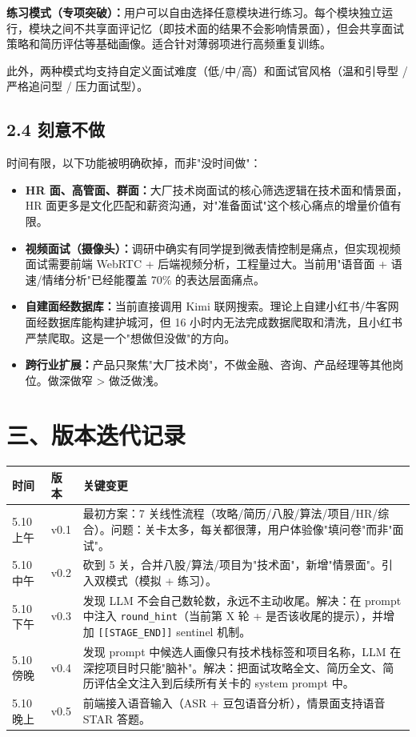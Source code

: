 \documentclass[11pt]{article}
\begin{document}
\textbf{练习模式（专项突破）：}用户可以自由选择任意模块进行练习。每个模块独立运行，模块之间不共享面评记忆（即技术面的结果不会影响情景面），但会共享面试策略和简历评估等基础画像。适合针对薄弱项进行高频重复训练。

此外，两种模式均支持自定义面试难度（低/中/高）和面试官风格（温和引导型 / 严格追问型 / 压力面试型）。

\subsection*{2.4 刻意不做}

时间有限，以下功能被明确砍掉，而非"没时间做"：

\begin{itemize}
    \item \textbf{HR 面、高管面、群面：}大厂技术岗面试的核心筛选逻辑在技术面和情景面，HR 面更多是文化匹配和薪资沟通，对"准备面试"这个核心痛点的增量价值有限。
    \item \textbf{视频面试（摄像头）：}调研中确实有同学提到微表情控制是痛点，但实现视频面试需要前端 WebRTC + 后端视频分析，工程量过大。当前用"语音面 + 语速/情绪分析"已经能覆盖 70\% 的表达层面痛点。
    \item \textbf{自建面经数据库：}当前直接调用 Kimi 联网搜索。理论上自建小红书/牛客网面经数据库能构建护城河，但 16 小时内无法完成数据爬取和清洗，且小红书严禁爬取。这是一个"想做但没做"的方向。
    \item \textbf{跨行业扩展：}产品只聚焦"大厂技术岗"，不做金融、咨询、产品经理等其他岗位。做深做窄 > 做泛做浅。
\end{itemize}

\section*{三、版本迭代记录}

\begin{table}[h]
\centering
\begin{tabular}{|l|l|p{8cm}|}
\hline
\textbf{时间} & \textbf{版本} & \textbf{关键变更} \\
\hline
5.10 上午 & v0.1 & 最初方案：7 关线性流程（攻略/简历/八股/算法/项目/HR/综合）。问题：关卡太多，每关都很薄，用户体验像"填问卷"而非"面试"。 \\
\hline
5.10 中午 & v0.2 & 砍到 5 关，合并八股/算法/项目为"技术面"，新增"情景面"。引入双模式（模拟 + 练习）。 \\
\hline
5.10 下午 & v0.3 & 发现 LLM 不会自己数轮数，永远不主动收尾。解决：在 prompt 中注入 \texttt{round\_hint}（当前第 X 轮 + 是否该收尾的提示），并增加 \texttt{[[STAGE\_END]]} sentinel 机制。 \\
\hline
5.10 傍晚 & v0.4 & 发现 prompt 中候选人画像只有技术栈标签和项目名称，LLM 在深挖项目时只能"脑补"。解决：把面试攻略全文、简历全文、简历评估全文注入到后续所有关卡的 system prompt 中。 \\
\hline
5.10 晚上 & v0.5 & 前端接入语音输入（ASR + 豆包语音分析），情景面支持语音 STAR 答题。 \\
\hline
\end{tabular}
\end{table}
\end{document}
